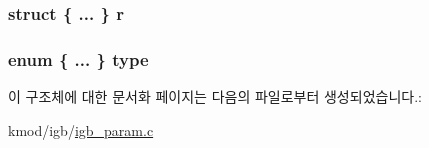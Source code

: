 \subsubsection[{\texorpdfstring{r}{r}}]{\setlength{\rightskip}{0pt plus 5cm}struct \{ ... \}   r}\hypertarget{structigb__option_a00d83a6cf59a5c65183583192896b975}{}\label{structigb__option_a00d83a6cf59a5c65183583192896b975}
\subsubsection[{\texorpdfstring{type}{type}}]{\setlength{\rightskip}{0pt plus 5cm}enum \{ ... \}   type}\hypertarget{structigb__option_aaf0786fec1a606c3c1a3d2c0ecbe0a63}{}\label{structigb__option_aaf0786fec1a606c3c1a3d2c0ecbe0a63}


이 구조체에 대한 문서화 페이지는 다음의 파일로부터 생성되었습니다.\+:\begin{DoxyCompactItemize}
\item 
kmod/igb/\hyperlink{igb__param_8c}{igb\+\_\+param.\+c}\end{DoxyCompactItemize}
